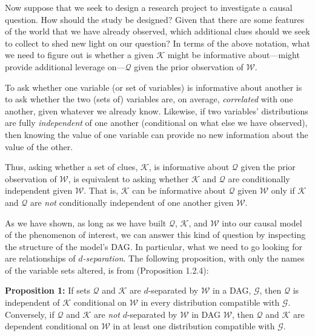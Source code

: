 \documentclass[12pt,]{book}
\begin{document}
Now suppose that we seek to design a research project to investigate a causal question. How should the study be designed? Given that there are some features of the world that we have already observed, which additional clues should we seek to collect to shed new light on our question? In terms of the above notation, what we need to figure out is whether a given \(\mathcal K\) might be informative about---might provide additional leverage on---\(\mathcal Q\) given the prior observation of \(\mathcal W\).

To ask whether one variable (or set of variables) is informative about another is to ask whether the two (sets of) variables are, on average, \emph{correlated} with one another, given whatever we already know. Likewise, if two variables' distributions are fully \emph{independent} of one another (conditional on what else we have observed), then knowing the value of one variable can provide no new information about the value of the other.

Thus, asking whether a set of clues, \(\mathcal K\), is informative about \(\mathcal Q\) given the prior observation of \(\mathcal W\), is equivalent to asking whether \(\mathcal K\) and \(\mathcal Q\) are conditionally independent given \(\mathcal W\). That is, \(\mathcal K\) can be informative about \(\mathcal Q\) given \(\mathcal W\) only if \(\mathcal K\) and \(\mathcal Q\) are \emph{not} conditionally independent of one another given \(\mathcal W\).

As we have shown, as long as we have built \(\mathcal Q\), \(\mathcal K\), and \(\mathcal W\) into our causal model of the phenomenon of interest, we can answer this kind of question by inspecting the structure of the model's DAG. In particular, what we need to go looking for are relationships of \emph{\(d\)-separation}. The following proposition, with only the names of the variable sets altered, is from \citet{pearl2009causality} (Proposition 1.2.4):

\textbf{Proposition 1:} If sets \(\mathcal Q\) and \(\mathcal K\) are \(d\)-separated by \(\mathcal W\) in a DAG, \(\mathcal G\), then \(\mathcal Q\) is independent of \(\mathcal K\) conditional on \(\mathcal W\) in every distribution compatible with \(\mathcal G\). Conversely, if \(\mathcal Q\) and \(\mathcal K\) are \emph{not} \(d\)-separated by \(\mathcal W\) in DAG \(\mathcal W\), then \(\mathcal Q\) and \(\mathcal K\) are dependent conditional on \(\mathcal W\) in at least one distribution compatible with \(\mathcal G\).
\end{document}
